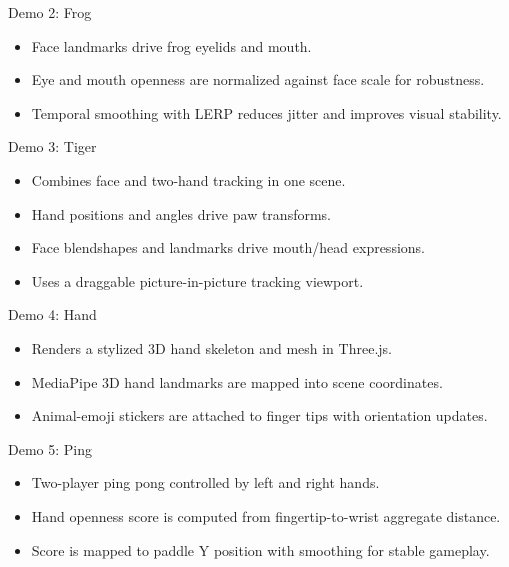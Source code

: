 \documentclass[aspectratio=169]{beamer}
\begin{document}
\begin{frame}{Demo 2: Frog}
  \begin{itemize}
    \item Face landmarks drive frog eyelids and mouth.
    \item Eye and mouth openness are normalized against face scale for robustness.
    \item Temporal smoothing with LERP reduces jitter and improves visual stability.
  \end{itemize}
\end{frame}

\begin{frame}{Demo 3: Tiger}
  \begin{itemize}
    \item Combines face and two-hand tracking in one scene.
    \item Hand positions and angles drive paw transforms.
    \item Face blendshapes and landmarks drive mouth/head expressions.
    \item Uses a draggable picture-in-picture tracking viewport.
  \end{itemize}
\end{frame}

\begin{frame}{Demo 4: Hand}
  \begin{itemize}
    \item Renders a stylized 3D hand skeleton and mesh in Three.js.
    \item MediaPipe 3D hand landmarks are mapped into scene coordinates.
    \item Animal-emoji stickers are attached to finger tips with orientation updates.
  \end{itemize}
\end{frame}

\begin{frame}{Demo 5: Ping}
  \begin{itemize}
    \item Two-player ping pong controlled by left and right hands.
    \item Hand openness score is computed from fingertip-to-wrist aggregate distance.
    \item Score is mapped to paddle Y position with smoothing for stable gameplay.
  \end{itemize}
\end{frame}
\end{document}
